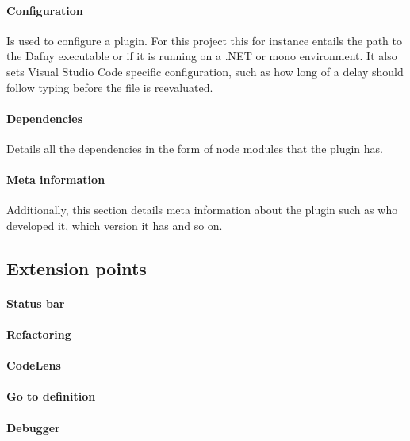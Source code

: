 \paragraph{Configuration}
Is used to configure a plugin. For this project this for instance entails the path to the Dafny executable or if it is running on a .NET or mono environment. It also sets Visual Studio Code specific configuration, such as how long of a delay should follow typing before the file is reevaluated.

\paragraph{Dependencies}
Details all the dependencies in the form of node modules that the plugin has.

\paragraph{Meta information}
Additionally, this section details meta information about the plugin such as who developed it, which version it has and so on.






\subsection{Extension points}

\paragraph{Status bar}

\paragraph{Refactoring}

\paragraph{CodeLens}

\paragraph{Go to definition}

\paragraph{Debugger}

